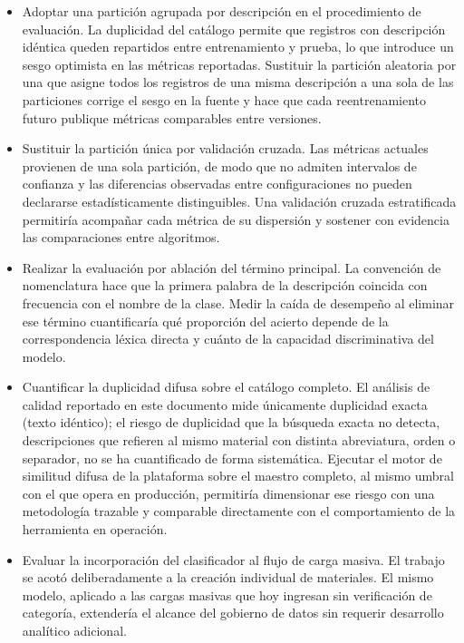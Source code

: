 \begin{itemize}
\item Adoptar una partición agrupada por descripción en el procedimiento de evaluación. La duplicidad del catálogo permite que registros con descripción idéntica queden repartidos entre entrenamiento y prueba, lo que introduce un sesgo optimista en las métricas reportadas. Sustituir la partición aleatoria por una que asigne todos los registros de una misma descripción a una sola de las particiones corrige el sesgo en la fuente y hace que cada reentrenamiento futuro publique métricas comparables entre versiones.

\item Sustituir la partición única por validación cruzada. Las métricas actuales provienen de una sola partición, de modo que no admiten intervalos de confianza y las diferencias observadas entre configuraciones no pueden declararse estadísticamente distinguibles. Una validación cruzada estratificada permitiría acompañar cada métrica de su dispersión y sostener con evidencia las comparaciones entre algoritmos.

\item Realizar la evaluación por ablación del término principal. La convención de nomenclatura hace que la primera palabra de la descripción coincida con frecuencia con el nombre de la clase. Medir la caída de desempeño al eliminar ese término cuantificaría qué proporción del acierto depende de la correspondencia léxica directa y cuánto de la capacidad discriminativa del modelo.

\item Cuantificar la duplicidad difusa sobre el catálogo completo. El análisis de calidad reportado en este documento mide únicamente duplicidad exacta (texto idéntico); el riesgo de duplicidad que la búsqueda exacta no detecta, descripciones que refieren al mismo material con distinta abreviatura, orden o separador, no se ha cuantificado de forma sistemática. Ejecutar el motor de similitud difusa de la plataforma sobre el maestro completo, al mismo umbral con el que opera en producción, permitiría dimensionar ese riesgo con una metodología trazable y comparable directamente con el comportamiento de la herramienta en operación.

\item Evaluar la incorporación del clasificador al flujo de carga masiva. El trabajo se acotó deliberadamente a la creación individual de materiales. El mismo modelo, aplicado a las cargas masivas que hoy ingresan sin verificación de categoría, extendería el alcance del gobierno de datos sin requerir desarrollo analítico adicional.
\end{itemize}